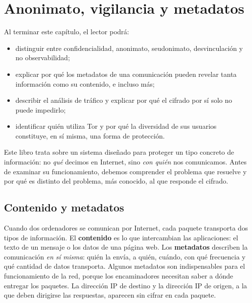 \chapter{Anonimato, vigilancia y metadatos}\label{cap:01-anonimato}

\begin{obiettivi}
Al terminar este capítulo, el lector podrá:
\begin{itemize}[nosep]
  \item distinguir entre confidencialidad, anonimato, seudonimato, desvinculación y no observabilidad;
  \item explicar por qué los metadatos de una comunicación pueden revelar tanta información como su contenido, e incluso más;
  \item describir el análisis de tráfico y explicar por qué el cifrado por sí solo no puede impedirlo;
  \item identificar quién utiliza Tor y por qué la diversidad de sus usuarios constituye, en sí misma, una forma de protección.
\end{itemize}
\end{obiettivi}

Este libro trata sobre un sistema diseñado para proteger un tipo concreto de información: no \emph{qué} decimos en Internet, sino \emph{con quién} nos comunicamos. Antes de examinar su funcionamiento, debemos comprender el problema que resuelve y por qué es distinto del problema, más conocido, al que responde el cifrado.

\section{Contenido y metadatos}\label{sec:anon-metadati}

Cuando dos ordenadores se comunican por Internet, cada paquete transporta dos tipos de información. El \textbf{contenido} es lo que intercambian las aplicaciones: el texto de un mensaje o los datos de una página web. Los \textbf{metadatos} describen la comunicación \emph{en sí misma}: quién la envía, a quién, cuándo, con qué frecuencia y qué cantidad de datos transporta. Algunos metadatos son indispensables para el funcionamiento de la red, porque los encaminadores necesitan saber a dónde entregar los paquetes. La dirección IP de destino y la dirección IP de origen, a la que deben dirigirse las respuestas, aparecen sin cifrar en cada paquete.

